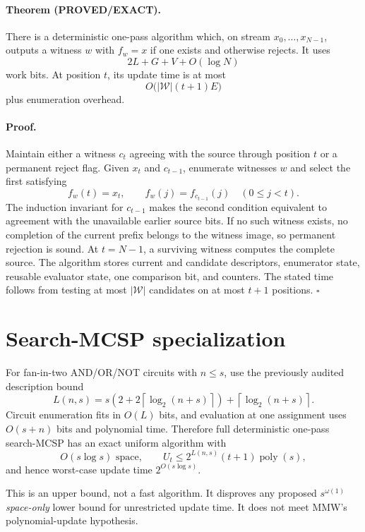 \documentclass[11pt]{article}
\begin{document}
\paragraph{Theorem (PROVED/EXACT).}
There is a deterministic one-pass algorithm which, on stream
$x_0,\ldots,x_{N-1}$, outputs a witness $w$ with $f_w=x$ if one exists and
otherwise rejects.  It uses
\[
 2L+G+V+O(\log N)
\]
work bits.  At position $t$, its update time is at most
\[
 O\bigl(|\mathcal W|(t+1)E\bigr)
\]
plus enumeration overhead.

\paragraph{Proof.}
Maintain either a witness $c_t$ agreeing with the source through position $t$
or a permanent reject flag.  Given $x_t$ and $c_{t-1}$, enumerate witnesses
$w$ and select the first satisfying
\[
 f_w(t)=x_t,
 \qquad
 f_w(j)=f_{c_{t-1}}(j)\quad(0\le j<t).
\]
The induction invariant for $c_{t-1}$ makes the second condition equivalent to
agreement with the unavailable earlier source bits.  If no such witness
exists, no completion of the current prefix belongs to the witness image, so
permanent rejection is sound.  At $t=N-1$, a surviving witness computes the
complete source.  The algorithm stores current and candidate descriptors,
enumerator state, reusable evaluator state, one comparison bit, and counters.
The stated time follows from testing at most $|\mathcal W|$ candidates on at
most $t+1$ positions. \hfill$\square$

\section{Search-MCSP specialization}
For fan-in-two AND/OR/NOT circuits with $n\le s$, use the previously audited
description bound
\[
 L(n,s)=s\left(2+2\left\lceil\log_2(n+s)\right\rceil\right)
 +\left\lceil\log_2(n+s)\right\rceil.
\]
Circuit enumeration fits in $O(L)$ bits, and evaluation at one assignment uses
$O(s+n)$ bits and polynomial time.  Therefore full deterministic one-pass
search-MCSP has an exact uniform algorithm with
\[
 O(s\log s)\text{ space},\qquad
 U_t\le 2^{L(n,s)}(t+1)\operatorname{poly}(s),
\]
and hence worst-case update time $2^{O(s\log s)}$.

This is an upper bound, not a fast algorithm.  It disproves any proposed
$s^{\omega(1)}$ \emph{space-only} lower bound for unrestricted update time.  It
does not meet MMW's polynomial-update hypothesis.
\end{document}
